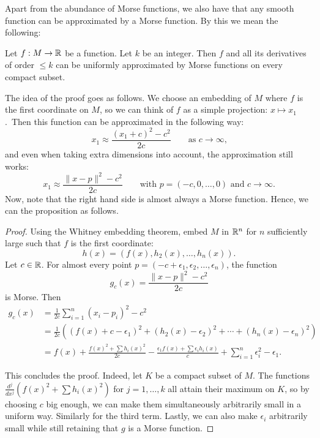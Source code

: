 Apart from the abundance of Morse functions, we also have that any smooth function can be approximated by a Morse function. By this we mean the following:
\begin{prop}
    Let $f: M \to  \mathbb{R}$ be a function.
    Let $k$ be an integer.
    Then $f$ and all its derivatives of order $\le k$ can be uniformly
    approximated by Morse functions on every compact subset.
\end{prop}

The idea of the proof goes as follows.
We choose an embedding of $M$ where $f$ is the first coordinate on $M$, so we can think of $f$ as a simple projection: $x \mapsto x_1$.\sidenotemark\ Then this function can be approximated in the following way:
\[
    x_1 \approx \frac{(x_1+c)^2 - c^2}{2c} \qquad \text{as $c \to  \infty$,}
\]
and even when taking extra dimensions into account, the approximation still works:
\[
    x_1 \approx \frac{\|x - p\|^2 - c^2}{2c} \qquad \text{with $p = (-c, 0, \ldots, 0)$ and $c\to  \infty$}
.\] 
Now, note that the right hand side is almost always a Morse function.  Hence, we can the proposition as follows.

\begin{proof}
    Using the Whitney embedding theorem, embed $M$ in $\mathbb{R}^{n}$ for $n$ sufficiently large such that $f$ is the first coordinate:
    \[
        h(x) = (f(x), h_2(x), \ldots, h_n(x))
    .\] 
    Let $c \in \mathbb{R}$. For almost every point $p = (-c + \epsilon_1, \epsilon_2, \ldots, \epsilon_n)$, the function
    \[
        g_c(x) = \frac{\|x - p\|^2 - c^2}{2c} 
    \] 
    is Morse.
    Then
    \begin{align*}
        g_c(x) &= \frac{1}{2c}  \sum_{i=1}^{n} (x_i - p_i)^2 - c^2\\
             &= \frac{1}{2c} \left((f(x) + c - \epsilon_1 )^2 + (h_2(x) - \epsilon_2)^2 + \cdots + (h_n(x) - \epsilon_n)^2\right)\\
             &= f(x) +  \frac{f(x)^2 + \sum h_i(x)^2}{2c} - \frac{\epsilon_1 f(x)  + \sum \epsilon_i h_i(x)}{c}  + \sum_{i=1}^{n} \epsilon_i^2 - \epsilon_1
    .\end{align*} 

    This concludes the proof.
    Indeed, let $K$ be a compact subset of $M$.
    The functions $\frac{d^{j}}{dx^{j}} (f(x)^2 + \sum h_i(x)^2)$ for $j = 1, \ldots,k$ all attain their maximum on $K$, so by choosing $c$ big enough, we can make them simultaneously arbitrarily small in a uniform way. Similarly for the third term.
    Lastly, we can also make $\epsilon_i$ arbitrarily small while still retaining that $g$ is a Morse function.
\end{proof}

